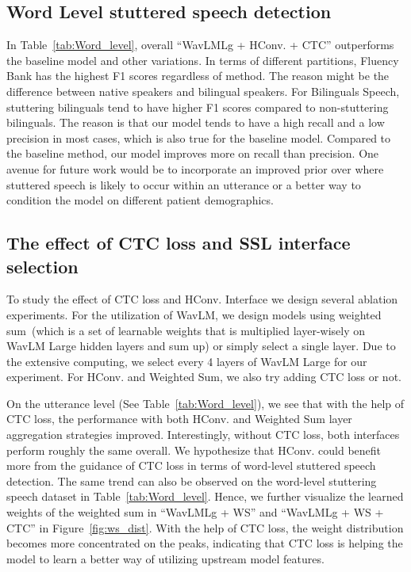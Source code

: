 \vspace{-10pt}
\subsection{Word Level stuttered speech detection}


In Table~\ref{tab:Word_level}, overall ``WavLMLg + HConv. + CTC'' outperforms the baseline model and other variations.
In terms of different partitions, Fluency Bank has the highest F1 scores regardless of method.
The reason might be the difference between native speakers and bilingual speakers.
For Bilinguals Speech, stuttering bilinguals tend to have higher F1 scores compared to non-stuttering bilinguals.
The reason is that our model tends to have a high recall and a low precision in most cases, which is also true for the baseline model.
Compared to the baseline method, our model improves more on recall than precision.
One avenue for future work would be to incorporate an improved prior over where stuttered speech is likely to occur within an utterance or a better way to condition the model on different patient demographics.

\vspace{-10pt}
\subsection{The effect of CTC loss and SSL interface selection}
To study the effect of CTC loss and HConv. Interface we design several ablation experiments.
For the utilization of WavLM, we design models using weighted sum~(which is a set of learnable weights that is multiplied layer-wisely on WavLM Large hidden layers and sum up) or simply select a single layer.
Due to the extensive computing, we select every 4 layers of WavLM Large for our experiment.
For HConv. and Weighted Sum, we also try adding CTC loss or not.



On the utterance level (See Table~\ref{tab:Word_level}), we see that with the help of CTC loss, the performance with both HConv. and  Weighted Sum layer aggregation strategies improved.
Interestingly, without CTC loss, both interfaces perform roughly the same overall.
We hypothesize that HConv. could benefit more from the guidance of CTC loss in terms of word-level stuttered speech detection.
The same trend can also be observed on the word-level stuttering speech dataset in Table~\ref{tab:Word_level}.
Hence, we further visualize the learned weights of the weighted sum in ``WavLMLg + WS'' and ``WavLMLg + WS + CTC'' in Figure~\ref{fig:ws_dist}.
With the help of CTC loss, the weight distribution becomes more concentrated on the peaks, indicating that CTC loss is helping the model to learn a better way of utilizing upstream model features.

